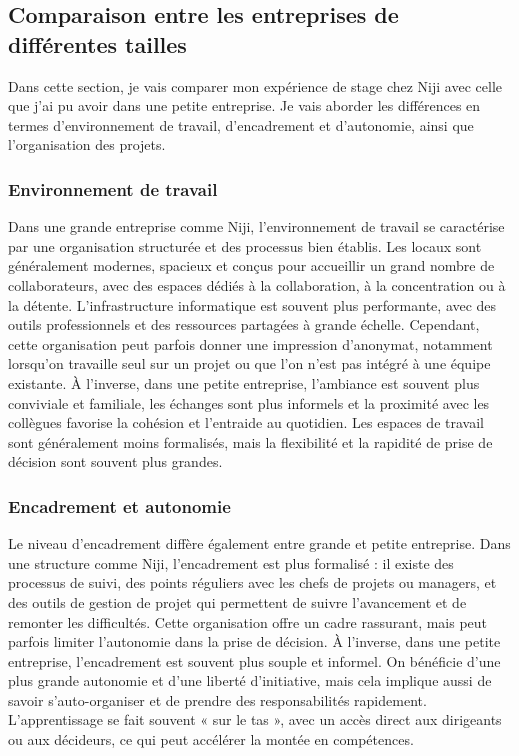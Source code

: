 \documentclass[12pt]{article}
\begin{document}
\subsection{Comparaison entre les entreprises de différentes tailles}
Dans cette section, je vais comparer mon expérience de stage chez Niji avec celle que j'ai pu avoir dans une petite entreprise. Je vais aborder les différences en termes d'environnement de travail, d'encadrement et d'autonomie, ainsi que l'organisation des projets.
\subsubsection{Environnement de travail}
Dans une grande entreprise comme Niji, l’environnement de travail se caractérise par une organisation structurée et des processus bien établis. Les locaux sont généralement modernes, spacieux et conçus pour accueillir un grand nombre de collaborateurs, avec des espaces dédiés à la collaboration, à la concentration ou à la détente. L’infrastructure informatique est souvent plus performante, avec des outils professionnels et des ressources partagées à grande échelle. Cependant, cette organisation peut parfois donner une impression d’anonymat, notamment lorsqu’on travaille seul sur un projet ou que l’on n’est pas intégré à une équipe existante. À l’inverse, dans une petite entreprise, l’ambiance est souvent plus conviviale et familiale, les échanges sont plus informels et la proximité avec les collègues favorise la cohésion et l’entraide au quotidien. Les espaces de travail sont généralement moins formalisés, mais la flexibilité et la rapidité de prise de décision sont souvent plus grandes.

\subsubsection{Encadrement et autonomie}
Le niveau d’encadrement diffère également entre grande et petite entreprise. Dans une structure comme Niji, l’encadrement est plus formalisé : il existe des processus de suivi, des points réguliers avec les chefs de projets ou managers, et des outils de gestion de projet qui permettent de suivre l’avancement et de remonter les difficultés. Cette organisation offre un cadre rassurant, mais peut parfois limiter l’autonomie dans la prise de décision. À l’inverse, dans une petite entreprise, l’encadrement est souvent plus souple et informel. On bénéficie d’une plus grande autonomie et d’une liberté d’initiative, mais cela implique aussi de savoir s’auto-organiser et de prendre des responsabilités rapidement. L’apprentissage se fait souvent « sur le tas », avec un accès direct aux dirigeants ou aux décideurs, ce qui peut accélérer la montée en compétences.
\end{document}
